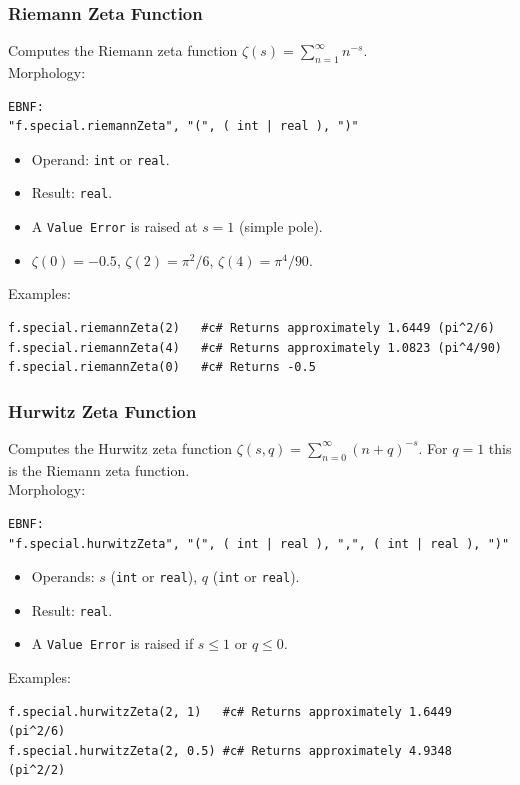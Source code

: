 \subsubsection{Riemann Zeta Function}
Computes the Riemann zeta function $\zeta(s) = \sum_{n=1}^{\infty} n^{-s}$. \\
Morphology:
\begin{verbatim}
EBNF:
"f.special.riemannZeta", "(", ( int | real ), ")"
\end{verbatim}
\begin{itemize}
\item Operand: \texttt{int} or \texttt{real}.
\item Result: \texttt{real}.
\item A \texttt{Value Error} is raised at $s = 1$ (simple pole).
\item $\zeta(0) = -0.5$, $\zeta(2) = \pi^2 / 6$, $\zeta(4) = \pi^4 / 90$.
\end{itemize}
Examples:
\begin{verbatim}
f.special.riemannZeta(2)   #c# Returns approximately 1.6449 (pi^2/6)
f.special.riemannZeta(4)   #c# Returns approximately 1.0823 (pi^4/90)
f.special.riemannZeta(0)   #c# Returns -0.5
\end{verbatim}

\subsubsection{Hurwitz Zeta Function}
Computes the Hurwitz zeta function $\zeta(s, q) = \sum_{n=0}^{\infty} (n+q)^{-s}$. For $q = 1$ this is the Riemann zeta function. \\
Morphology:
\begin{verbatim}
EBNF:
"f.special.hurwitzZeta", "(", ( int | real ), ",", ( int | real ), ")"
\end{verbatim}
\begin{itemize}
\item Operands: $s$ (\texttt{int} or \texttt{real}), $q$ (\texttt{int} or \texttt{real}).
\item Result: \texttt{real}.
\item A \texttt{Value Error} is raised if $s \leq 1$ or $q \leq 0$.
\end{itemize}
Examples:
\begin{verbatim}
f.special.hurwitzZeta(2, 1)   #c# Returns approximately 1.6449 (pi^2/6)
f.special.hurwitzZeta(2, 0.5) #c# Returns approximately 4.9348 (pi^2/2)
\end{verbatim}

